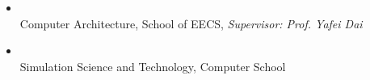 
  \begin{itemize}[leftmargin=*]
    \item
      \\
      Computer Architecture, School of EECS, \textit{Supervisor: Prof. Yafei Dai}
    \item
      \\
      Simulation Science and Technology, Computer School
  \end{itemize}